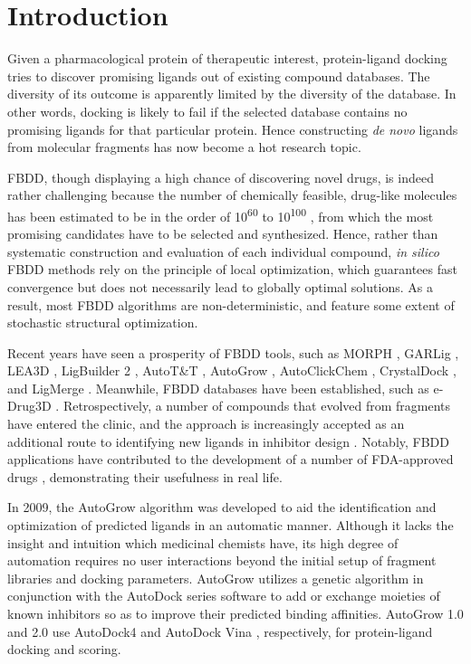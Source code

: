 \section{Introduction}

Given a pharmacological protein of therapeutic interest, protein-ligand docking tries to discover promising ligands out of existing compound databases. The diversity of its outcome is apparently limited by the diversity of the database. In other words, docking is likely to fail if the selected database contains no promising ligands for that particular protein. Hence constructing \textit{de novo} ligands from molecular fragments has now become a hot research topic.

FBDD, though displaying a high chance of discovering novel drugs, is indeed rather challenging because the number of chemically feasible, drug-like molecules has been estimated to be in the order of 10\textsuperscript{60} to 10\textsuperscript{100} \citep{1104}, from which the most promising candidates have to be selected and synthesized. Hence, rather than systematic construction and evaluation of each individual compound, \textit{in silico} FBDD methods rely on the principle of local optimization, which guarantees fast convergence but does not necessarily lead to globally optimal solutions. As a result, most FBDD algorithms are non-deterministic, and feature some extent of stochastic structural optimization.

Recent years have seen a prosperity of FBDD tools, such as MORPH \citep{365}, GARLig \citep{471}, LEA3D \citep{1223}, LigBuilder 2 \citep{749}, AutoT\&T \citep{780}, AutoGrow \citep{466}, AutoClickChem \citep{1051}, CrystalDock \citep{954}, and LigMerge \citep{1181}. Meanwhile, FBDD databases have been established, such as e-Drug3D \citep{1125}. Retrospectively, a number of compounds that evolved from fragments have entered the clinic, and the approach is increasingly accepted as an additional route to identifying new ligands in inhibitor design \citep{363,367,472,474,1006}. Notably, FBDD applications have contributed to the development of a number of FDA-approved drugs \citep{363}, demonstrating their usefulness in real life.

In 2009, the AutoGrow algorithm \citep{466} was developed to aid the identification and optimization of predicted ligands in an automatic manner. Although it lacks the insight and intuition which medicinal chemists have, its high degree of automation requires no user interactions beyond the initial setup of fragment libraries and docking parameters. AutoGrow utilizes a genetic algorithm in conjunction with the AutoDock series software \citep{596,595} to add or exchange moieties of known inhibitors so as to improve their predicted binding affinities. AutoGrow 1.0 and 2.0 use AutoDock4 \citep{596} and AutoDock Vina \citep{595}, respectively, for protein-ligand docking and scoring.

